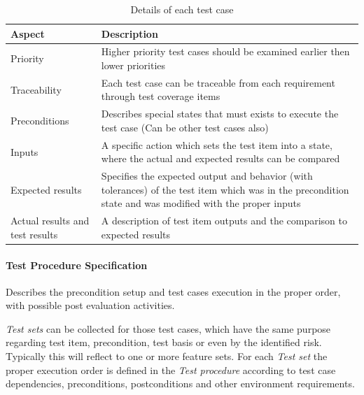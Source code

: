 \begin{table}[h]
	\caption{Details of each test case}
	\label{table:TestDoc:TestCases}
	\begin{center}
		\renewcommand{\arraystretch}{1.8}
		\begin{tabu} 
			to 0.9 \textwidth
			{  X[c]  X[c] }
			\toprule
			Aspect                          & Description                                                                                                                                               \\ \midrule
			Priority                        & Higher priority test cases should be examined earlier then lower priorities                                                                               \\
			Traceability                    & Each test case can be traceable from each requirement through test coverage items                                                                         \\
			Preconditions                   & Describes special states that must exists to execute the test case (Can be other test cases also)                                                         \\
			Inputs                          & A specific action which sets the test item into a state, where the actual and expected results can be compared                                            \\
			Expected results                & Specifies the expected output and behavior (with tolerances) of the test item which was in the precondition state and was modified with the proper inputs \\
			Actual results and test results & A description of test item outputs and the comparison to expected results                                                                                 \\ \bottomrule
		\end{tabu}
	\end{center}
\end{table} 

\paragraph{Test Procedure Specification}
Describes the precondition setup and test cases execution in the proper order, with possible post evaluation activities.

\textit{Test sets} can be collected for those test cases, which have the same purpose regarding test item, precondition, test basis or even by the identified risk. Typically this will reflect to one or more feature sets. For each \textit{Test set} the proper execution order is defined in the \textit{Test procedure} according to test case dependencies, preconditions, postconditions and other environment requirements.

